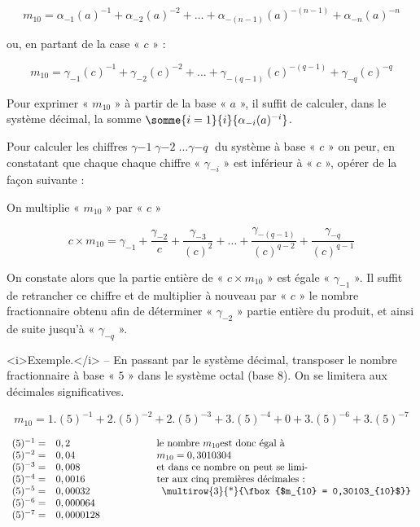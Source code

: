 \[ m_{10} =  \alpha_{-1}(a)^{-1} +  \alpha_{-2}(a)^{-2} +  \ldots + \alpha_{-(n-1)}(a)^{-(n-1)} +  \alpha_{-n}(a)^{-n} \]

ou, en partant de la case « $c$ » :

\[ m_{10} =  \gamma_{-1}(c)^{-1} +  \gamma_{-2}(c)^{-2} +  \ldots + \gamma_{-(q-1)}(c)^{-(q-1)} +  \gamma_{-q}(c)^{-q} \]

Pour exprimer « $m_{10}$ » à partir de la base  « $a$ », il suffit de calculer, dans le système décimal, la somme  $\somme{i=1}{i}{\alpha_{-i}(a)^{-i}}$.

Pour calculer les chiffres $\gamma{-1}\; \gamma{-2}\; \ldots \gamma{-q}\;  $ du système à base « $c$ » on peur, en constatant  
que chaque chaque chiffre « $\gamma_{-i}$ » est inférieur à « $c$ », opérer de la façon suivante : 

On multiplie « $m_{10}$ »  par « $c$ » 

\[ c \times m_{10} = \gamma_{-1} + \dfrac{\gamma_{-2}}{c} +   \dfrac{\gamma_{-3}}{(c)^2}  +   \ldots + \dfrac{\gamma_{-(q-1)}}{(c)^{q-2}} +   \dfrac{\gamma_{-q}}{(c)^{q-1}}  \]

On constate alors que la partie entière de « $c\times m_{10}$ » est égale « $\gamma_{-1}$ ». Il suffit de retrancher ce chiffre et de multiplier à nouveau par « $c$ » le nombre fractionnaire obtenu afin de déterminer « $\gamma_{-2}$ » partie entière du produit, et ainsi de suite jusqu'à « $\gamma_{-q}$ ».

<i>Exemple.</i> -- En passant par le système décimal, transposer le nombre fractionnaire à base  « $5$ »  dans le système octal (base 8). On se limitera aux décimales significatives. 

\[ m_{10} = 1 . (5)^{-1} + 2 . (5)^{-2} + 2 . (5)^{-3} + 3 . (5)^{-4} + 0 + 3 . (5)^{-6} + 3 . (5)^{-7} \] 

\[
\begin{array}{rl@{\hspace*{2cm}}l}
     (5)^{-1} = & 0,2         & \text{le nombre } m_{10} \text{est donc égal à} \\ 
     (5)^{-2} = & 0,04        &  m_{10} = 0,3010304 \\ 
     (5)^{-3} = & 0,008       & \text{et dans ce nombre on peut se limi-} \\ 
     (5)^{-4} = & 0,0016      & \text{ter aux cinq premières décimales : } \\ 
     (5)^{-5} = & 0,00032     & \multicolumn{1}{c}{$\multirow{3}{*}{\fbox{$m_{10} = 0,30103_{10}$}}$}  \\ 
     (5)^{-6} = & 0,000064    &   \\ 
     (5)^{-7} = & 0,0000128   &   \\ 
\end{array}
\]

